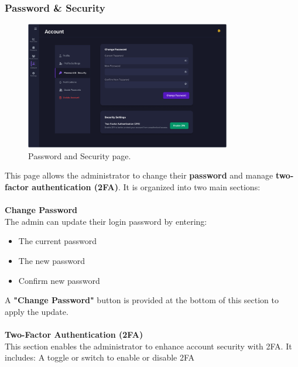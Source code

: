 \documentclass[12pt]{article}
\begin{document}
	\subsubsection{Password \& Security}
	\begin{figure}[H]
		\centering
		\includegraphics[width=0.8\textwidth]{pictures/admin/Password_Admin}
		\caption{Password and Security page.}\label{fig:figure6}
	\end{figure}
	This page allows the administrator to change their \textbf{password} and manage \textbf{two-factor authentication (2FA)}.
	It is organized into two main sections: \\ \\
	\textbf{Change Password} \\
	The admin can update their login password by entering:
	\begin{itemize}
		\item The current password
		\item The new password
		\item Confirm new password
	\end{itemize}
	A \textbf{"Change Password"} button is provided at the bottom of this section to apply the update. \\ \\
	\textbf{Two-Factor Authentication (2FA)} \\
	This section enables the administrator to enhance account security with 2FA. It includes: A toggle or switch to enable or disable 2FA
	
	
\end{document}
